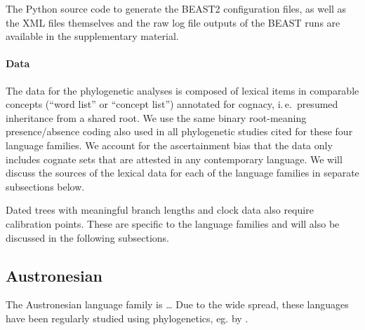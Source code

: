 \documentclass[]{rsos}%
\begin{document}
The Python source code to generate the BEAST2 configuration files, as well as
the XML files themselves and the raw log file outputs of the BEAST runs are
available in the supplementary material.


\paragraph{Data}

The data for the phylogenetic analyses is composed of lexical items in comparable concepts (“word list” or “concept list”) annotated
for cognacy, i.\,e.\ presumed inheritance from a shared root.
We use the same binary root-meaning presence/absence coding also used in all
phylogenetic studies cited for these four language families.
We account for the ascertainment bias that the data
only includes cognate sets that are attested in any contemporary language.
We will discuss the sources of the lexical data for each of the language families in separate subsections below.

Dated trees with meaningful branch lengths and clock data also require calibration points.
These are specific to the language families and will also be discussed in the following subsections.


\subsection{Austronesian}\label{s:austronesian}

The Austronesian language family is …
Due to the wide spread, these languages have been regularly studied using phylogenetics, eg. by
\textcite{gray2009language,greenhill2017evolutionary,greenhill2018population}.
\end{document}
